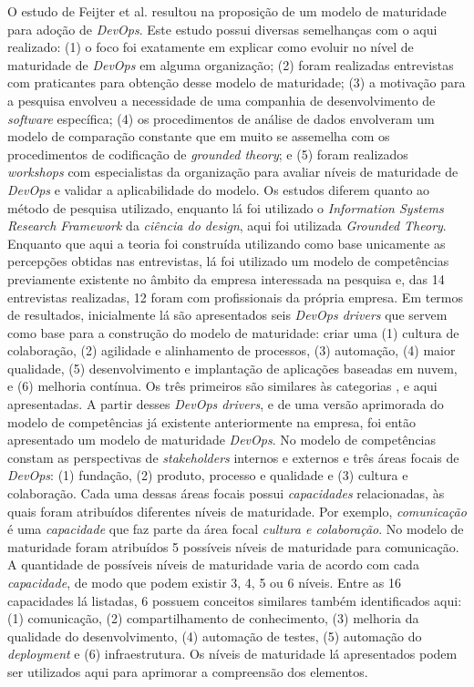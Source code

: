 O estudo de Feijter et al. \cite{feijter2017towards} resultou na proposição de
um modelo de maturidade para adoção de {\it DevOps}. Este estudo possui diversas
semelhanças com o aqui realizado: (1) o foco foi exatamente em explicar como evoluir
no nível de maturidade de {\it DevOps} em alguma organização; (2) foram realizadas
entrevistas com praticantes para obtenção desse modelo de maturidade; (3) a motivação
para a pesquisa envolveu a necessidade de uma companhia de desenvolvimento de
{\it software} específica; (4) os procedimentos de análise de dados envolveram um modelo de
comparação constante que em muito se assemelha com os procedimentos de codificação
de {\it grounded theory}; e (5) foram realizados {\it workshops} com especialistas
da organização para avaliar níveis de maturidade de {\it DevOps} e validar
a aplicabilidade do modelo. Os estudos diferem quanto ao método de pesquisa
utilizado, enquanto lá foi utilizado o {\it Information Systems Research
Framework} da \emph{ciência do design}, aqui foi utilizada
{\it Grounded Theory}. Enquanto que aqui a teoria foi construída utilizando
como base unicamente as percepções obtidas nas entrevistas, lá foi utilizado
um modelo de competências previamente existente no âmbito da empresa interessada
na pesquisa e, das 14 entrevistas realizadas, 12 foram com profissionais da
própria empresa. Em termos de resultados, inicialmente lá são apresentados seis
{\it DevOps drivers} que servem como base para a construção do modelo de
maturidade: criar uma (1) cultura de colaboração, (2) agilidade e alinhamento
de processos, (3) automação, (4) maior qualidade, (5) desenvolvimento e
implantação de aplicações baseadas em nuvem, e (6) melhoria contínua. Os três
primeiros são similares às categorias , 
e  aqui apresentadas. A partir desses {\it DevOps drivers}, e
de uma versão aprimorada do modelo de competências já existente anteriormente
na empresa, foi então apresentado um modelo de maturidade {\it DevOps}. No modelo
de competências constam as perspectivas de {\it stakeholders} internos e
externos e três áreas focais de {\it DevOps}: (1) fundação, (2) produto,
processo e qualidade e (3) cultura e colaboração. Cada uma dessas áreas focais
possui \emph{capacidades} relacionadas, às quais foram atribuídos diferentes
níveis de maturidade. Por exemplo, \emph{comunicação} é uma \emph{capacidade}
que faz parte da área focal \emph{cultura e colaboração}. No modelo de
maturidade foram atribuídos 5 possíveis níveis de maturidade para comunicação.
A quantidade de possíveis níveis de maturidade varia de acordo com cada
\emph{capacidade}, de modo que podem existir 3, 4, 5 ou 6 níveis. Entre as
16 capacidades lá listadas, 6 possuem conceitos similares também identificados aqui:
(1) comunicação, (2) compartilhamento de conhecimento, (3) melhoria da qualidade
do desenvolvimento, (4) automação de testes, (5) automação do {\it deployment} e
(6) infraestrutura. Os níveis de maturidade lá apresentados podem ser utilizados
aqui para aprimorar a compreensão dos elementos.

